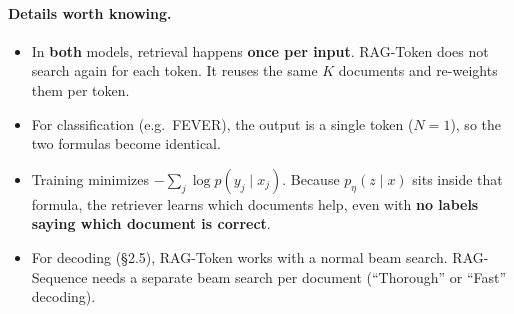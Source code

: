 \documentclass[11pt]{article}
\begin{document}
\paragraph{Details worth knowing.}
\begin{itemize}[nosep]
  \item In \textbf{both} models, retrieval happens \textbf{once per input}. RAG-Token does not search again for each token. It reuses the same $K$ documents and re-weights them per token.
  \item For classification (e.g.\ FEVER), the output is a single token ($N = 1$), so the two formulas become identical.
  \item Training minimizes $-\sum_j \log p(y_j \mid x_j)$. Because $p_\eta(z \mid x)$ sits inside that formula, the retriever learns which documents help, even with \textbf{no labels saying which document is correct}.
  \item For decoding (\S2.5), RAG-Token works with a normal beam search. RAG-Sequence needs a separate beam search per document (``Thorough'' or ``Fast'' decoding).
\end{itemize}
\end{document}
